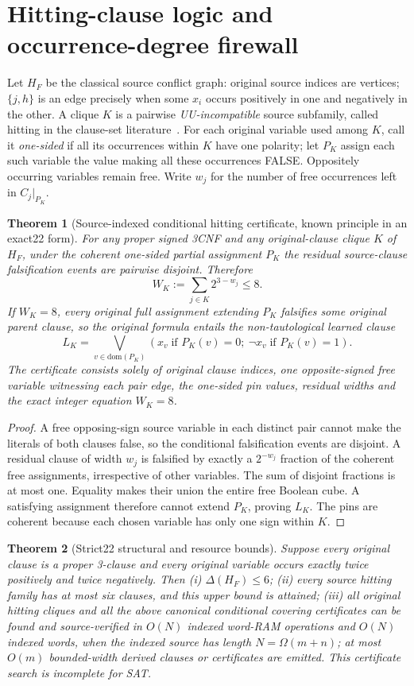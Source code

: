 \documentclass[10pt]{article}
\newtheorem{theorem}{Theorem}
\begin{document}
\section{Hitting-clause logic and occurrence-degree firewall}
Let $H_F$ be the classical source conflict graph: original source indices are vertices; $\{j,h\}$ is an edge precisely when some $x_i$ occurs positively in one and negatively in the other. A clique $K$ is a pairwise \emph{UU-incompatible} source subfamily, called hitting in the clause-set literature~\cite{Kullmann2003,Kullmann2011}. For each original variable used among $K$, call it \emph{one-sided} if all its occurrences within $K$ have one polarity; let $P_K$ assign each such variable the value making all these occurrences FALSE. Oppositely occurring variables remain free. Write $w_j$ for the number of free occurrences left in $C_j|_{P_K}$.
\begin{theorem}[Source-indexed conditional hitting certificate, known principle in an exact22 form]
For any proper signed 3CNF and any original-clause clique $K$ of $H_F$, under the coherent one-sided partial assignment $P_K$ the residual source-clause falsification events are pairwise disjoint. Therefore
\[
 W_K:=\sum_{j\in K}2^{3-w_j}\le8.
\]
If $W_K=8$, every original full assignment extending $P_K$ falsifies some original parent clause, so the original formula entails the non-tautological learned clause
\[
 L_K=\bigvee_{v\in\mathrm{dom}(P_K)}(x_v\;\text{if }P_K(v)=0;\ \neg x_v\;\text{if }P_K(v)=1).
\]
The certificate consists solely of original clause indices, one opposite-signed \emph{free} variable witnessing each pair edge, the one-sided pin values, residual widths and the exact integer equation $W_K=8$.
\end{theorem}
\begin{proof}
A free opposing-sign source variable in each distinct pair cannot make the literals of both clauses false, so the conditional falsification events are disjoint. A residual clause of width $w_j$ is falsified by exactly a $2^{-w_j}$ fraction of the coherent free assignments, irrespective of other variables. The sum of disjoint fractions is at most one. Equality makes their union the entire free Boolean cube. A satisfying assignment therefore cannot extend $P_K$, proving $L_K$. The pins are coherent because each chosen variable has only one sign within $K$.
\end{proof}
\begin{theorem}[Strict22 structural and resource bounds]
Suppose every original clause is a proper 3-clause and every original variable occurs exactly twice positively and twice negatively. Then (i) $\Delta(H_F)\le6$; (ii) every source hitting family has at most six clauses, and this upper bound is attained; (iii) all original hitting cliques and all the above canonical conditional covering certificates can be found and source-verified in $O(N)$ indexed word-RAM operations and $O(N)$ indexed words, when the indexed source has length $N=\Omega(m+n)$; at most $O(m)$ bounded-width derived clauses or certificates are emitted. This certificate search is \emph{incomplete for SAT}.
\end{theorem}
\end{document}
